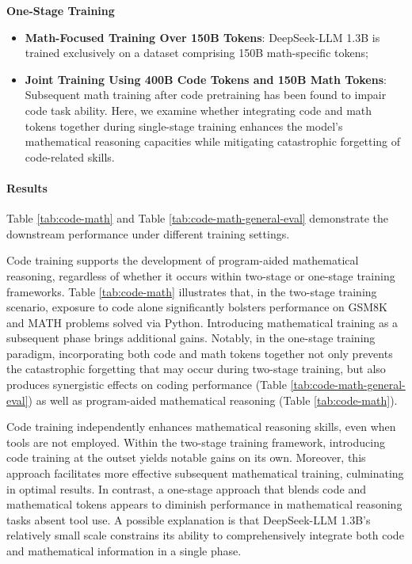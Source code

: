 \begin{itemize}[topsep=0pt]
\begin{itemize}[topsep=0pt]
\textbf{One-Stage Training}

\begin{itemize}[topsep=0pt]
    \item \textbf{Math-Focused Training Over 150B Tokens}: DeepSeek-LLM 1.3B is trained exclusively on a dataset comprising 150B math-specific tokens;
    \item \textbf{Joint Training Using 400B Code Tokens and 150B Math Tokens}: Subsequent math training after code pretraining has been found to impair code task ability. Here, we examine whether integrating code and math tokens together during single-stage training enhances the model's mathematical reasoning capacities while mitigating catastrophic forgetting of code-related skills.
\end{itemize}

\paragraph{Results}
Table \ref{tab:code-math} and Table \ref{tab:code-math-general-eval} demonstrate the downstream performance under different training settings.

Code training supports the development of program-aided mathematical reasoning, regardless of whether it occurs within two-stage or one-stage training frameworks. Table \ref{tab:code-math} illustrates that, in the two-stage training scenario, exposure to code alone significantly bolsters performance on GSM8K and MATH problems solved via Python. Introducing mathematical training as a subsequent phase brings additional gains. Notably, in the one-stage training paradigm, incorporating both code and math tokens together not only prevents the catastrophic forgetting that may occur during two-stage training, but also produces synergistic effects on coding performance (Table \ref{tab:code-math-general-eval}) as well as program-aided mathematical reasoning (Table \ref{tab:code-math}).

Code training independently enhances mathematical reasoning skills, even when tools are not employed. Within the two-stage training framework, introducing code training at the outset yields notable gains on its own. Moreover, this approach facilitates more effective subsequent mathematical training, culminating in optimal results. In contrast, a one-stage approach that blends code and mathematical tokens appears to diminish performance in mathematical reasoning tasks absent tool use. A possible explanation is that DeepSeek-LLM 1.3B’s relatively small scale constrains its ability to comprehensively integrate both code and mathematical information in a single phase.


\end{itemize}
\end{itemize}
